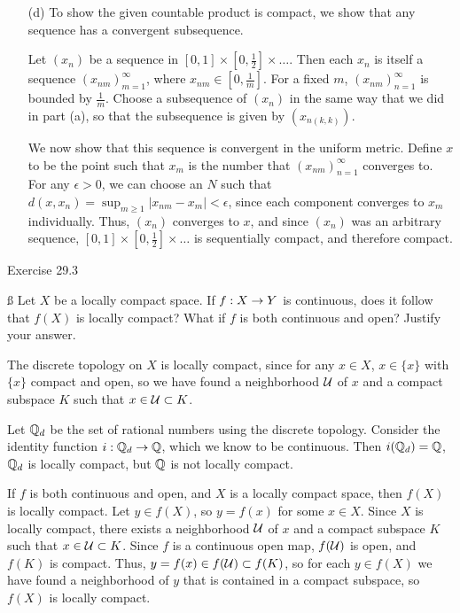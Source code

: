 \documentclass{hmwk}
\begin{document}
\begin{solution}
\begin{itemize}
    \item[(d)] To show the given countable product is compact, we show that any sequence has a convergent subsequence. 

    Let $(x_n)$ be a sequence in $[0, 1] \times [0, \frac{1}{2}] \times \dots$. Then each $x_n$ is itself a sequence $(x_{nm})_{m=1}^\infty$, where $x_{nm} \in [0, \frac{1}{m}]$. For a fixed $m$, $(x_{nm})_{n=1}^\infty$ is bounded by $\frac{1}{m}$. Choose a subsequence of $(x_n)$ in the same way that we did in part (a), so that the subsequence is given by $(x_{n(k, k)})$. 

    We now show that this sequence is convergent in the uniform metric. Define $x$ to be the point such that $x_m$ is the number that $(x_{nm})_{n=1}^\infty$ converges to. For any $\epsilon > 0$, we can choose an $N$ such that $d(x, x_n) = \sup_{m \geq 1} |x_{nm} - x_m| < \epsilon$, since each component converges to $x_m$ individually. Thus, $(x_n)$ converges to $x$, and since $(x_n)$ was an arbitrary sequence, $[0, 1] \times [0, \frac{1}{2}] \times \dots $ is sequentially compact, and therefore compact. 
\end{itemize}
\end{solution}

\begin{problem}{Exercise 29.3}

    \ss
    \noindent Let $X$ be a locally compact space. If $f: X \rightarrow Y$ is continuous, does it follow that $f(X)$ is locally compact? What if $f$ is both continuous and open? Justify your answer. 
\end{problem}

\begin{solution}

\pre The discrete topology on $X$ is locally compact, since for any $x \in X$, $x \in \{x\}$ with $\{x\}$ compact and open, so we have found a neighborhood $\mathcal{U}$ of $x$ and a compact subspace $K$ such that $x \in \mathcal{U} \subset K$. 

\pre Let $\mathbb{Q}_d$ be the set of rational numbers using the discrete topology. Consider the identity function $i: \mathbb{Q}_d \rightarrow \mathbb{Q}$, which we know to be continuous. Then $i(\mathbb{Q}_d) = \mathbb{Q}$, $\mathbb{Q}_d$ is locally compact, but $\mathbb{Q}$ is not locally compact. 

\pre If $f$ is both continuous and open, and $X$ is a locally compact space, then $f(X)$ is locally compact. Let $y \in f(X)$, so $y = f(x)$ for some $x \in X$. Since $X$ is locally compact, there exists a neighborhood $\mathcal{U}$ of $x$ and a compact subspace $K$ such that $x \in \mathcal{U} \subset K$. Since $f$ is a continuous open map, $f(\mathcal{U})$ is open, and $f(K)$ is compact. Thus, $y = f(x) \in f(\mathcal{U}) \subset f(K)$, so for each $y \in f(X)$ we have found a neighborhood of $y$ that is contained in a compact subspace, so $f(X)$ is locally compact. 
\end{solution}
\end{document}

